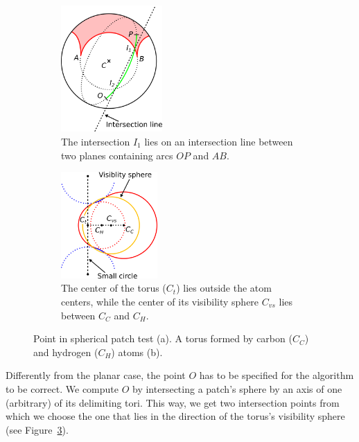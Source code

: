 \begin{figure}[htp]
  \centering
  \begin{subfigure}[c]{0.52\columnwidth}
    \centering
    \includegraphics[height=1.9in]{image/patch.png}
    \caption{%
		The intersection $I_1$ lies on an intersection line between two planes containing arcs $OP$ and $AB$.}
		\label{fig:spherical-patch}
  \end{subfigure}%
  \quad
  \begin{subfigure}[c]{0.44\columnwidth}
    \centering
    \includegraphics[height=1.6in]{image/outer.png}
    \caption{%
		The center of the torus ($C_{t}$) lies outside the atom centers, while the center of its visibility sphere $C_{vs}$ lies between $C_C$ and $C_H$.}
		\label{fig:outer-point}
  \end{subfigure}
\caption{Point in spherical patch test (a). A torus formed by carbon ($C_C$) and hydrogen ($C_H$) atoms (b).}
\end{figure}

Differently from the planar case, the point $O$ has to be specified for the algorithm to be correct.
We compute $O$ by intersecting a patch's sphere by an axis of one (arbitrary) of its delimiting tori.
This way, we get two intersection points from which we choose the one that lies in the direction of the torus's visibility sphere (see Figure~\ref{fig:outer-point}).

